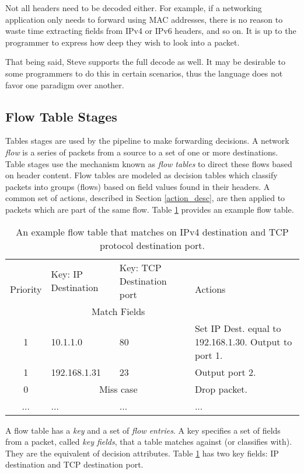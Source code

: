 Not all headers need to be decoded either. For
example, if a networking application only needs to forward using MAC addresses,
there is no reason to waste time extracting fields from IPv4 or IPv6 headers,
and so on. It is up to the programmer to express how deep they wish to look into
a packet.

That being said, Steve supports the full decode as well. It may be desirable to
some programmers to do this in certain scenarios, thus the language does not
favor one paradigm over another.

\subsection{Flow Table Stages} \label{table_desc}

Tables stages are used by the pipeline to make forwarding decisions.
A network \emph{flow} is a series of packets from a source to a set of one or
more destinations.
Table stages use the mechanism known as \emph{flow tables} to direct these
flows \cite{openflow_spec} based on header content. 
Flow tables are modeled as decision tables which classify packets into
groups (flows) based on field values found in their headers. 
A common set of actions, described in Section \ref{action_desc}, are then applied to packets which are part of the same flow.
Table \ref{tbl:flow_table} provides an example flow table.

\begin{table}[ht]
\caption{An example flow table that matches on IPv4 destination and TCP protocol
destination port.}
\label{tbl:flow_table}
\centering
\begin{tabularx}{\linewidth}{| c | X | X | X |}
\hline
\multirow{2}{*}{Priority} & Key: IP Destination & Key: TCP Destination port  &
\multirow{2}{*}{Actions} \\
\cline{2-3}
  & \multicolumn{2}{|c|}{Match Fields} & \\
\hline
\hline
1 & 10.1.1.0 & 80 & Set IP Dest. equal to 192.168.1.30. Output to port 1. \\
\hline
1 & 192.168.1.31 & 23 & Output port 2. \\
\hline
0 & \multicolumn{2}{|c|}{Miss case} & Drop packet. \\
\hline
... & ... & ... & ... \\
\hline
\end{tabularx}
\end{table}


A flow table has a \emph{key} and a set of \emph{flow entries}. A
key specifies a set of fields from a packet, called \emph{key fields}, that a table matches
against (or classifies with). They are the equivalent of decision attributes.
Table \ref{tbl:flow_table} has two key fields: IP destination and TCP
destination port.

